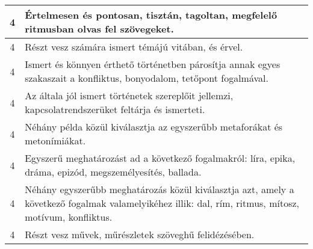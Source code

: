 \begin{longtable}{c | p{12cm} }
                                          4 &  Értelmesen és pontosan, tisztán, tagoltan, megfelelő ritmusban olvas fel szövegeket. \\ \hline
                                          4 &  Részt vesz számára ismert témájú vitában, és érvel. \\ \hline
                                          4 &  Ismert és könnyen érthető történetben párosítja annak egyes szakaszait a konfliktus, bonyodalom, tetőpont fogalmával. \\ \hline
                                          4 &  Az általa jól ismert történetek szereplőit jellemzi, kapcsolatrendszerüket feltárja és ismerteti. \\ \hline
                                          4 &  Néhány példa közül kiválasztja az egyszerűbb metaforákat és metonímiákat. \\ \hline
                                          4 &  Egyszerű meghatározást ad a következő fogalmakról: líra, epika, dráma, epizód, megszemélyesítés, ballada. \\ \hline
                                          4 &  Néhány egyszerűbb meghatározás közül kiválasztja azt, amely a következő fogalmak valamelyikéhez illik: dal, rím, ritmus, mítosz, motívum, konfliktus. \\ \hline
                                          4 &  Részt vesz művek, műrészletek szöveghű felidézésében. \\ \hline
                                      
                        \end{longtable}
            \clearpage

